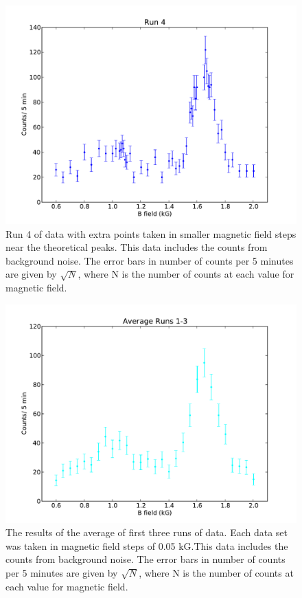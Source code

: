 \begin{figure}[H]
\begin{center}
\includegraphics[width=6 in]{figure3.pdf}
\caption{Run 4 of data with extra points taken in smaller magnetic field steps near the theoretical peaks. This data includes the counts from background noise. The error bars in number of counts per 5 minutes are given by $\sqrt{N}$, where N is the number of counts at each value for magnetic field.}
\end{center}
\end{figure}
\begin{figure}[H]
\begin{center}
\includegraphics[width=6 in]{figure4.pdf}
\caption{The results of the average  of first three runs of data. Each data set was taken in magnetic field steps of 0.05 kG.This data includes the counts from background noise. The error bars in number of counts per 5 minutes are given by $\sqrt{N}$, where N is the number of counts at each value for magnetic field. }
\end{center}
\end{figure}
